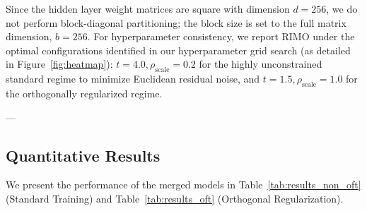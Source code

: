 Since the hidden layer weight matrices are square with dimension $d = 256$, we do not perform block-diagonal partitioning; the block size is set to the full matrix dimension, $b = 256$. For hyperparameter consistency, we report RIMO under the optimal configurations identified in our hyperparameter grid search (as detailed in Figure~\ref{fig:heatmap}): $t = 4.0, \rho_{\text{scale}} = 0.2$ for the highly unconstrained standard regime to minimize Euclidean residual noise, and $t = 1.5, \rho_{\text{scale}} = 1.0$ for the orthogonally regularized regime.

---

\subsection{Quantitative Results}
\label{subsec:results}

We present the performance of the merged models in Table~\ref{tab:results_non_oft} (Standard Training) and Table~\ref{tab:results_oft} (Orthogonal Regularization).

